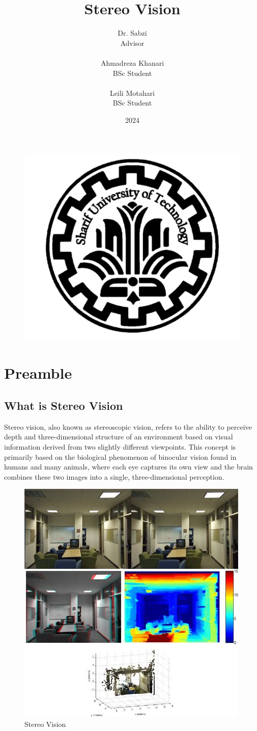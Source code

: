 \documentclass[22pt]{report}
\title{Stereo Vision}
\author{
Dr. Sabzi \\ Advisor \\\\
Ahmadreza Khanari \\ BSc Student \\ \\
Leili Motahari \\ BSc Student}
\date{2024}
\begin{document}
\begin{figure}
	\includegraphics[width=0.4\linewidth]{Images/Sharif-eng-logo}
	\label{Shariflogo}
	\centering
\end{figure}

\maketitle
\tableofcontents
\setcounter{chapter}{0}

\chapter{Preamble}
    \section{What is Stereo Vision} 
        Stereo vision, also known as stereoscopic vision, refers to the ability to perceive depth and three-dimensional structure of an environment based on visual information derived from two slightly different viewpoints. This concept is primarily based on the biological phenomenon of binocular vision found in humans and many animals, where each eye captures its own view and the brain combines these two images into a single, three-dimensional perception.
        \newline
    
        \begin{figure}[h]
            \centering
            \includegraphics[width=0.5\linewidth]{Images/WhatIsIt.jpg}
            \caption{Stereo Vision}
            \label{fig:enter-label}
        \end{figure}
\end{document}
